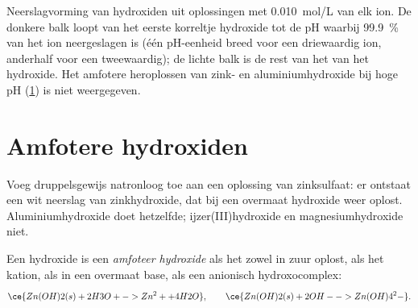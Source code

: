 \begin{omfigure}

{\small Neerslagvorming van hydroxiden uit oplossingen met
\qty{0.010}{mol/L} van elk ion. De donkere balk loopt van het eerste
korreltje hydroxide tot de pH waarbij \qty{99.9}{\percent} van het ion
neergeslagen is (één pH-eenheid breed voor een driewaardig ion, anderhalf
voor een tweewaardig); de lichte balk is de rest van het
 van het hydroxide. Het amfotere heroplossen van zink-
en aluminiumhydroxide bij hoge pH
(\cref{sec:b1:precipitation:amphoteric}) is niet weergegeven.}
\end{omfigure}

\section{Amfotere hydroxiden}\label{sec:b1:precipitation:amphoteric}

Voeg druppelsgewijs natronloog toe aan een oplossing van zinksulfaat: er
ontstaat een wit neerslag van zinkhydroxide, dat bij een overmaat
hydroxide weer oplost. Aluminiumhydroxide doet hetzelfde;
ijzer(III)hydroxide en magnesiumhydroxide niet.

\begin{definition}\label{def:b1:precipitation:amphoteric-hydroxide}
Een hydroxide is een \emph{amfoteer hydroxide}
als het zowel in zuur oplost, als het kation, als in een overmaat base,
als een anionisch hydroxocomplex:
\[
  \ce{Zn(OH)2(s) + 2H3O+ -> Zn^2+ + 4H2O}, \qquad
  \ce{Zn(OH)2(s) + 2OH- -> Zn(OH)4^2-} .
\]
\end{definition}


